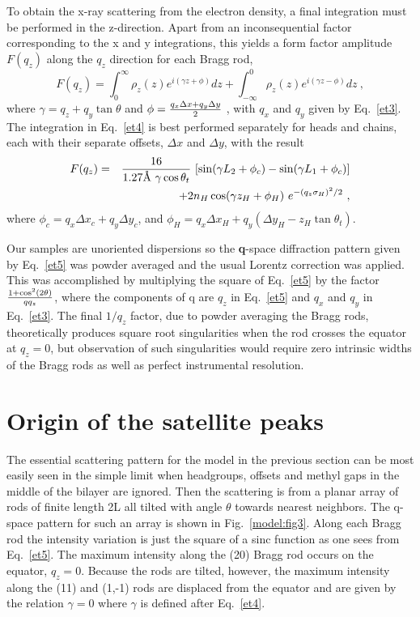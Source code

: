 To obtain the x-ray scattering from the electron density, a final integration must 
be performed in the z-direction. Apart from an inconsequential factor
corresponding to the x and y integrations, this yields a form factor
amplitude $F(q_{z})$ along the $q_{z}$ direction for each Bragg rod,
\begin{equation}
\label{et4}
F(q_{z}) = \int_{0}^{\infty} {\rho}_{z}(z) e^{i (\gamma z + \phi)} dz + \int_{- \infty}^{0} 
{\rho}_{z} (z) e^{i (\gamma z - \phi)} dz~,
\end{equation}
where \( \gamma = q_{z}+q_{y} \tan \theta \) and \( \phi = {q_{x} \Delta x + q_{y} \Delta y 
\over 2} \) , with $q_{x}$ and $q_{y}$ given by Eq.\ \ref{et3}.
The integration in Eq.\ \ref{et4} is best performed separately for heads and
chains, each with their separate offsets, $\Delta x$ and $\Delta y$, with the result
\begin{eqnarray}
\label{et5}
F(q_{z}) =&& {16 \over 1.27\mbox{\AA}~\gamma \cos {\theta}_{t}}~[\sin(\gamma L_{2} + 
\phi_{c}) - \sin(\gamma L_{1} + \phi_{c})] \nonumber \\
&& + 2 n_{H} \cos(\gamma z_{H} + \phi_{H})~e^{-(q_{z} {\sigma}_{H})^{2}/2}~,
\end{eqnarray}
where \( \phi_{c} = q_{x} \Delta x_{c} + q_{y} \Delta y_{c} \), and \( \phi_{H} = q_{x} 
\Delta x_{H} + q_{y} (\Delta y_{H} - z_{H} \tan {\theta}_{t}) \).

Our samples are unoriented dispersions so the {\bf q}-space diffraction pattern
given by Eq.\ \ref{et5} was powder averaged and the usual Lorentz correction
was applied.  This was accomplished by multiplying the square of
Eq.\ \ref{et5} by the factor
\( { {1+{\cos}^2 (2 \theta)} \over q q_{z}} \), where the components of q are $q_{z}$
in Eq.\ \ref{et5} and $q_{x}$ and $q_{y}$ in Eq.\ \ref{et3}.
The final $1/q_{z}$ factor, due to powder averaging the Bragg rods, theoretically
produces square root singularities when the rod crosses the equator at $q_{z}=0$,
but observation of such singularities would require zero intrinsic widths
of the Bragg rods as well as perfect instrumental resolution.  


\section{Origin of the satellite peaks}
\label{gel_model_sate}

The essential scattering pattern for the model in the previous section can be
most easily seen in the simple limit when headgroups, offsets and methyl
gaps in the middle of the bilayer are ignored.  Then the scattering is from
a planar array of rods of finite length 2L all tilted with angle $\theta$
towards nearest neighbors.  The q-space pattern for such an array is
shown in Fig.\ \ref{model:fig3}.  Along each Bragg rod the intensity variation is
just the square of a sinc function as one sees from Eq.\ \ref{et5}.  The maximum
intensity along the (20) Bragg rod occurs on the equator, \( q_{z} = 0 \).
Because the rods are tilted, however, the maximum intensity along the (11) and (1,-1)
rods are displaced from the equator and are given by the relation $\gamma = 0$ 
where $\gamma$ is defined after Eq.\ \ref{et4}.

